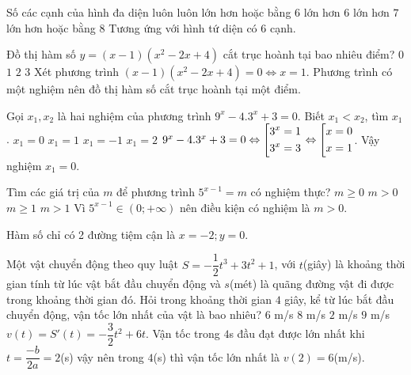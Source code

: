 \begin{ex}%
	Số các cạnh của hình đa diện luôn luôn
	\choice
	{\True lớn hơn hoặc bằng $6$}
	{lớn hơn $6$}
	{lớn hơn $7$}
	{lớn hơn hoặc bằng $8$}
	\loigiai
	{Tương ứng với hình tứ diện có $6$ cạnh.
	}
\end{ex}
\begin{ex}%
	Đồ thị hàm số $y=(x-1)(x^2-2x+4)$ cắt trục hoành tại bao nhiêu điểm?	
	\choice
	{$ 0$}
	{\True $1 $}
	{$2 $}
	{$3 $}
	\loigiai
	{Xét phương trình $(x-1)(x^2-2x+4)=0\Leftrightarrow x=1$. Phương trình có một nghiệm nên đồ thị hàm số cắt trục hoành tại một điểm.}
\end{ex}
\begin{ex}%
	Gọi $x_1,x_2$ là hai nghiệm của phương trình $9^x-4.3^x+3=0$. Biết $x_1<x_2$, tìm $x_1$.	
	\choice
	{\True $x_1=0 $}
	{$x_1=1 $}
	{$x_1=-1 $}
	{$x_1=2 $}
	\loigiai
	{$9^x-4.3^x+3=0\Leftrightarrow \left[\begin{aligned}&3^x=1\\&3^x=3\end{aligned}\right.\Leftrightarrow\left[\begin{aligned}&x=0\\&x=1\end{aligned}\right.$. Vậy nghiệm $x_1=0$.}
\end{ex}
\begin{ex}%
	Tìm các giá trị của $m$ để phương trình $5^{x-1}=m$	có nghiệm thực?
	\choice
	{$m\geq 0 $}
	{\True $m>0 $}
	{$m\geq 1 $}
	{$m>1 $}
	\loigiai
	{Vì $5^{x-1}\in (0;+\infty)$ nên điều kiện có nghiệm là $m>0$.}
\end{ex}
\begin{ex}%
	{}
	\loigiai
	{Hàm số chỉ có 2 đường tiệm cận là $x=-2;y=0$.}	
\end{ex}
\begin{ex}%
	Một vật chuyển động theo quy luật $S=-\dfrac{1}{2}t^3+3t^2+1 $, với $t$(giây) là khoảng thời gian tính từ lúc vật bắt đầu chuyển động và $s$(mét) là quãng đường vật đi được trong khoảng thời gian đó. Hỏi trong khoảng thời gian $4$ giây, kể từ lúc bắt đầu chuyển động, vận tốc lớn nhất của vật là bao nhiêu?
	\choice
	{\True $6$ m/s}
	{$8 $ m/s}
	{$2 $ m/s}
	{$9 $ m/s}
	\loigiai
	{$v\left(t\right)=S'\left(t\right)=-\dfrac{3}{2}t^2+6t$. Vận tốc trong $4$s đầu đạt được lớn nhất khi $t=\dfrac{-b}{2a}=2$(s) vậy nên trong $4$(s) thì vận tốc lớn nhất là $v(2)=6$(m/s).}
\end{ex}
